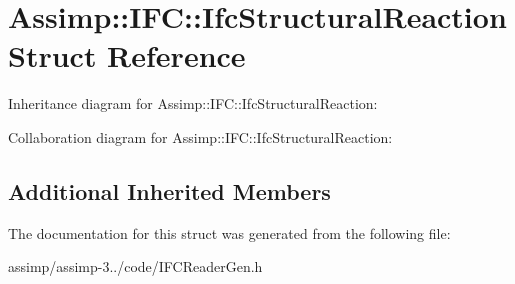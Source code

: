 \hypertarget{struct_assimp_1_1_i_f_c_1_1_ifc_structural_reaction}{\section{Assimp\+:\+:I\+F\+C\+:\+:Ifc\+Structural\+Reaction Struct Reference}
\label{struct_assimp_1_1_i_f_c_1_1_ifc_structural_reaction}
}


Inheritance diagram for Assimp\+:\+:I\+F\+C\+:\+:Ifc\+Structural\+Reaction\+:


Collaboration diagram for Assimp\+:\+:I\+F\+C\+:\+:Ifc\+Structural\+Reaction\+:
\subsection*{Additional Inherited Members}


The documentation for this struct was generated from the following file\+:\begin{DoxyCompactItemize}
\item 
assimp/assimp-\/3../code/I\+F\+C\+Reader\+Gen.\+h\end{DoxyCompactItemize}
